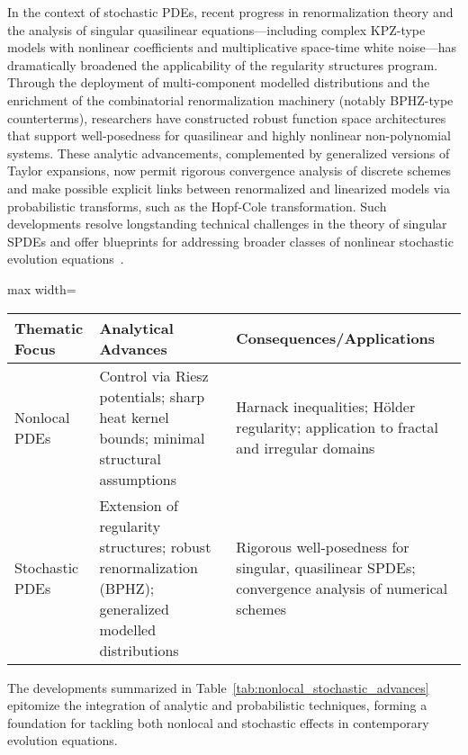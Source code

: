 \documentclass[sigconf]{acmart}
\begin{document}
In the context of stochastic PDEs, recent progress in renormalization theory and the analysis of singular quasilinear equations—including complex KPZ-type models with nonlinear coefficients and multiplicative space-time white noise—has dramatically broadened the applicability of the regularity structures program. Through the deployment of multi-component modelled distributions and the enrichment of the combinatorial renormalization machinery (notably BPHZ-type counterterms), researchers have constructed robust function space architectures that support well-posedness for quasilinear and highly nonlinear non-polynomial systems. These analytic advancements, complemented by generalized versions of Taylor expansions, now permit rigorous convergence analysis of discrete schemes and make possible explicit links between renormalized and linearized models via probabilistic transforms, such as the Hopf-Cole transformation. Such developments resolve longstanding technical challenges in the theory of singular SPDEs and offer blueprints for addressing broader classes of nonlinear stochastic evolution equations~\cite{ref94}.

\begin{table*}[htbp]
\centering
\caption{Core Advances in Nonlocal and Stochastic PDE Analysis}
\label{tab:nonlocal_stochastic_advances}
\begin{adjustbox}{max width=\textwidth}
\begin{tabular}{lll}
\toprule
\textbf{Thematic Focus} & \textbf{Analytical Advances} & \textbf{Consequences/Applications} \\
\midrule
Nonlocal PDEs & Control via Riesz potentials; sharp heat kernel bounds; minimal structural assumptions & Harnack inequalities; Hölder regularity; application to fractal and irregular domains \\
Stochastic PDEs & Extension of regularity structures; robust renormalization (BPHZ); generalized modelled distributions & Rigorous well-posedness for singular, quasilinear SPDEs; convergence analysis of numerical schemes \\
\bottomrule
\end{tabular}
\end{adjustbox}
\end{table*}

The developments summarized in Table~\ref{tab:nonlocal_stochastic_advances} epitomize the integration of analytic and probabilistic techniques, forming a foundation for tackling both nonlocal and stochastic effects in contemporary evolution equations.
\end{document}
